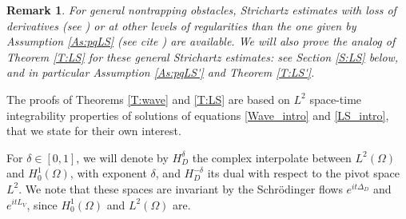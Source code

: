 \documentclass[10pt,leqno]{amsart}
\newtheorem{remark}[theorem]{Remark}
\theoremstyle{definition}%
\theoremstyle{remark}
\numberwithin{equation}{section}
\renewcommand{\^}{\widehat}%
\begin{document}
\begin{remark}
For general nontrapping obstacles, Strichartz estimates with loss of derivatives (see \cite{Anton08}) or at other levels of regularities than the one given by Assumption \ref{As:pqLS}
 (see cite \cite{BlSmSo12}) are available. We will also prove the analog of Theorem \ref{T:LS} for these general Strichartz estimates:
see Section \ref{S:LS} below, and in particular Assumption \ref{As:pqLS'} and Theorem \ref{T:LS'}.
 \end{remark}

The proofs of Theorems \ref{T:wave} and \ref{T:LS} are based on $L^2$ space-time integrability properties of solutions of equations \eqref{Wave_intro} and \eqref{LS_intro}, that we state for their own interest.

For $\delta\in [0,1]$, we will denote by $H^{\delta}_D$ the complex interpolate between $L^2(\Omega)$ and $H^{1}_0(\Omega)$, with exponent $\delta$, and $H^{-\delta}_D$ its dual with respect to the pivot space $L^2$. We note that these spaces are invariant by the Schr\"odinger flows $e^{it\Delta_D}$ and $e^{itL_V}$, since $H^1_0(\Omega)$ and $L^2(\Omega)$ are.
\end{document}
